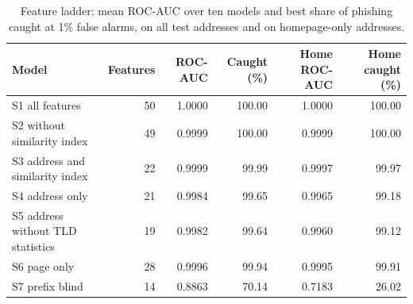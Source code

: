 \begin{table}[t]
\centering
\caption{Feature ladder: mean ROC-AUC over ten models and best share of phishing caught at 1\% false alarms, on all test addresses and on homepage-only addresses.}
\label{tab:ladder}
\begin{tabular}{lrrrrr}
\toprule
Model & Features & ROC-AUC & Caught (\%) & Home ROC-AUC & Home caught (\%) \\
\midrule
S1 all features & 50 & 1.0000 & 100.00 & 1.0000 & 100.00 \\
S2 without similarity index & 49 & 0.9999 & 100.00 & 0.9999 & 100.00 \\
S3 address and similarity index & 22 & 0.9999 & 99.99 & 0.9997 & 99.97 \\
S4 address only & 21 & 0.9984 & 99.65 & 0.9965 & 99.18 \\
S5 address without TLD statistics & 19 & 0.9982 & 99.64 & 0.9960 & 99.12 \\
S6 page only & 28 & 0.9996 & 99.94 & 0.9995 & 99.91 \\
S7 prefix blind & 14 & 0.8863 & 70.14 & 0.7183 & 26.02 \\
\bottomrule
\end{tabular}
\end{table}